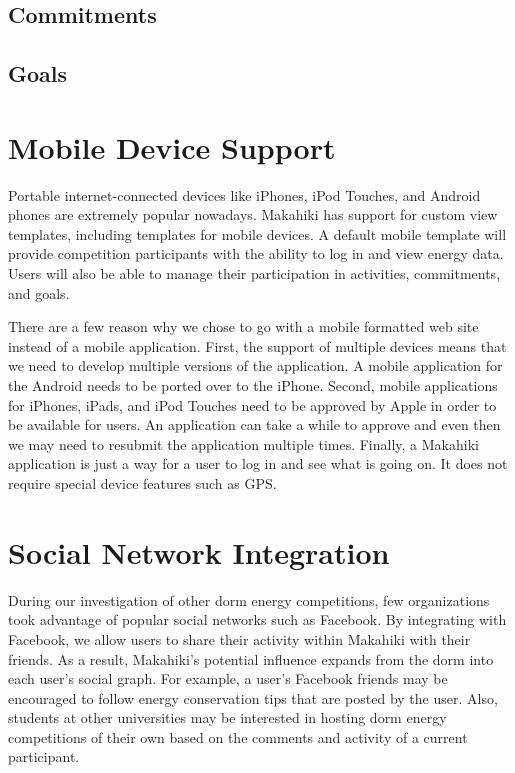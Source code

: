 \subsection{Commitments}

\subsection{Goals}

\section{Mobile Device Support}
\label{mobile}

Portable internet-connected devices like iPhones, iPod Touches, and Android phones are extremely popular nowadays.  Makahiki has support for custom view templates, including templates for mobile devices.  A default mobile template will provide competition participants with the ability to log in and view energy data.  Users will also be able to manage their participation in activities, commitments, and goals.

There are a few reason why we chose to go with a mobile formatted web site instead of a mobile application.  First, the support of multiple devices means that we need to develop multiple versions of the application.  A mobile application for the Android needs to be ported over to the iPhone. Second, mobile applications for iPhones, iPads, and iPod Touches need to be approved by Apple in order to be available for users.  An application can take a while to approve and even then we may need to resubmit the application multiple times.  Finally, a Makahiki application is just a way for a user to log in and see what is going on.  It does not require special device features such as GPS.

\section{Social Network Integration}
\label{socialint}

During our investigation of other dorm energy competitions, few organizations took advantage of popular social networks such as Facebook.  By integrating with Facebook, we allow users to share their activity within Makahiki with their friends.  As a result, Makahiki's potential influence expands from the dorm into each user's social graph.  For example, a user's Facebook friends may be encouraged to follow energy conservation tips that are posted by the user.  Also, students at other universities may be interested in hosting dorm energy competitions of their own based on the comments and activity of a current participant.

